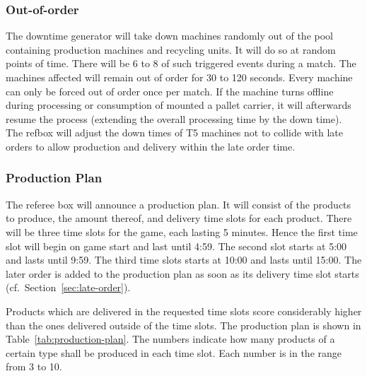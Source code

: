 \documentclass[12pt,twoside]{article}
\newcommand{\refsec}[1]{Section~\ref{#1}}
\begin{document}
\subsubsection{Out-of-order}
\label{sec:out-of-order}
The downtime generator will take down machines randomly out of the
pool containing production machines and recycling units. It will do so
at random points of time. There will be 6 to 8 of such triggered
events during a match. The machines affected will remain out of order
for 30 to 120 seconds. Every machine can only be forced out of order
once per match. If the machine turns offline during processing or
consumption of mounted a pallet carrier, it will afterwards resume the
process (extending the overall processing time by the down time).  The
refbox will adjust the down times of T5 machines not to collide with
late orders to allow production and delivery within the late order
time.

\subsubsection{Production Plan}
The referee box will announce a production plan. It will consist of
the products to produce, the amount thereof, and delivery time slots
for each product. There will be three time slots for the game, each
lasting 5 minutes. Hence the first time slot will begin on game start
and last until 4:59. The second slot starts at 5:00 and lasts until
9:59. The third time slots starts at 10:00 and lasts until 15:00.  The
later order is added to the production plan as soon as its delivery
time slot starts (cf.~\refsec{sec:late-order}).

Products which are delivered in the requested time slots score
considerably higher than the ones delivered outside of the time
slots. The production plan is shown in
Table~\ref{tab:production-plan}. The numbers indicate how many
products of a certain type shall be produced in each time slot. Each
number is in the range from 3 to 10.
\end{document}
